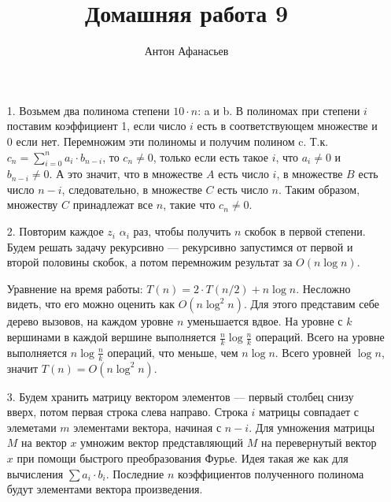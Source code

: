 \documentclass[10pt]{article}
\begin{document}
\title{Домашняя работа 9}
\author{Антон Афанасьев}
\maketitle

\begin{enumerate}
	\item[1.] Возьмем два полинома степени $10 \cdot n$: a и b. В полиномах при степени $i$ поставим коэффициент 1, если число $i$ есть в соответствующем множестве и 0 если нет. Перемножим эти полиномы и получим полином c. Т.к. $c_n = \sum_{i=0}^n a_i \cdot b_{n-i}$, то $c_n \neq 0$, только если есть такое $i$, что $a_i \neq 0$ и $b_{n-i} \neq 0$. А это значит, что в множестве $A$ есть число $i$, в множестве $B$ есть число $n-i$, следовательно, в множестве $C$ есть число $n$. Таким образом, множеству $C$ принадлежат все $n$, такие что $c_n \neq 0$.
	
	\item[2.] Повторим каждое $z_i$ $\alpha_i$ раз, чтобы получить $n$ скобок в первой степени. Будем решать задачу рекурсивно --- рекурсивно запустимся от первой и второй половины скобок, а потом перемножим результат за $O(n \log n)$.
	
	Уравнение на время работы: $T(n) = 2 \cdot T(n/2) + n \log n$. Несложно видеть, что его можно оценить как $O(n \log^2 n)$. Для этого представим себе дерево вызовов, на каждом уровне $n$ уменьшается вдвое. На уровне с $k$ вершинами в каждой вершине выполняется $\frac{n}{k} \log \frac{n}{k}$ операций. Всего на уровне выполняется $n \log \frac{n}{k}$ операций, что меньше, чем $n \log n$. Всего уровней $\log n$, значит $T(n) = O(n \log^2 n)$.
	
	\item[3.] Будем хранить матрицу вектором элементов --- первый столбец снизу вверх, потом первая строка слева направо. Строка $i$ матрицы совпадает с элеметами $m$ элементами вектора, начиная с $n-i$. Для умножения матрицы $M$ на вектор $x$ умножим вектор представляющий $M$ на перевернутый вектор $x$ при помощи быстрого преобразования Фурье. Идея такая же как для вычисления $\sum a_i \cdot b_i$.  Последние $n$ коэффициентов полученного полинома будут элементами вектора произведения.
\end{enumerate}
\end{document}
